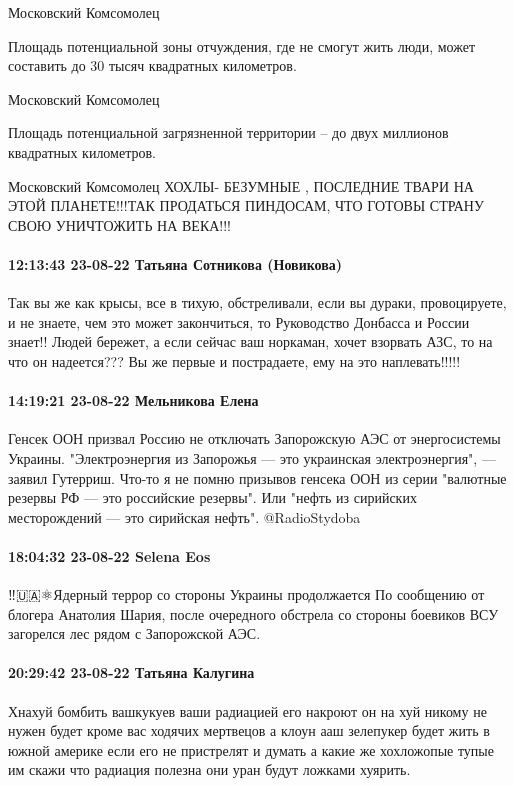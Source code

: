 Московский Комсомолец

Площадь потенциальной зоны отчуждения, где не смогут жить люди, может составить
до 30 тысяч квадратных километров.

Московский Комсомолец

Площадь потенциальной загрязненной территории – до двух миллионов квадратных
километров.

Московский Комсомолец ХОХЛЫ- БЕЗУМНЫЕ , ПОСЛЕДНИЕ ТВАРИ НА ЭТОЙ ПЛАНЕТЕ!!!ТАК
ПРОДАТЬСЯ ПИНДОСАМ, ЧТО ГОТОВЫ СТРАНУ СВОЮ УНИЧТОЖИТЬ НА ВЕКА!!!

\paragraph{12:13:43 23-08-22 Татьяна Сотникова (Новикова)}

Так вы же как крысы, все в тихую, обстреливали, если вы дураки, провоцируете, и
не знаете, чем это может закончиться, то Руководство Донбасса и России знает!!
Людей бережет, а если сейчас ваш норкаман, хочет взорвать АЗС, то на что он
надеется??? Вы же первые и пострадаете, ему на это наплевать!!!!!

\paragraph{14:19:21 23-08-22 Мельникова Елена}

Генсек ООН призвал Россию не отключать Запорожскую АЭС от энергосистемы
Украины.  "Электроэнергия из Запорожья — это украинская электроэнергия", —
заявил Гутерриш.  Что-то я не помню призывов генсека ООН из серии "валютные
резервы РФ — это российские резервы".  Или "нефть из сирийских месторождений —
это сирийская нефть".
@RadioStydoba

\paragraph{18:04:32 23-08-22 Selena Eos}

‼️🇺🇦⚛️Ядерный террор со стороны Украины продолжается
По сообщению от блогера Анатолия Шария, после очередного обстрела со стороны боевиков ВСУ загорелся лес рядом с Запорожской АЭС.

\paragraph{20:29:42 23-08-22 Татьяна Калугина}

Хнахуй бомбить вашкукуев ваши радиацией его накроют он на хуй никому не нужен
будет кроме вас ходячих мертвецов а клоун ааш зелепукер будет жить в южной
америке если его не пристрелят и думать а какие же хохложопые тупые им скажи
что радиация полезна они уран будут ложками хуярить.

